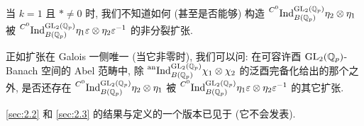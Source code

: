\begin{remark}\label{rem:2.3.2}
当 $k = 1$ 且 $* \neq 0$ 时, 我们不知道如何 (甚至是否能够) 构造 $\prescript{C^{0}}{}{\mathrm{Ind}}_{B(\mathbb{Q}_p)}^{\mathrm{GL}_2(\mathbb{Q}_p)} \eta_2 \otimes \eta_1$ 被 $\prescript{C^{0}}{}{\mathrm{Ind}}_{B(\mathbb{Q}_p)}^{\mathrm{GL}_2(\mathbb{Q}_p)} \eta_1\varepsilon \otimes \eta_2\varepsilon^{-1}$ 的非分裂扩张.
\end{remark}

\begin{remark}\label{rem:2.3.3}
正如扩张在 Galois 一侧唯一 (当它非零时), 我们可以问: 在可容许酉 $\mathrm{GL}_2(\mathbb{Q}_p)$-Banach 空间的 Abel 范畴中, 除 $\prescript{\mathrm{an}}{}{\mathrm{Ind}}_{B(\mathbb{Q}_p)}^{\mathrm{GL}_2(\mathbb{Q}_p)} \chi_1 \otimes \chi_2$ 的泛酉完备化给出的那个之外, 是否还存在 $\prescript{C^{0}}{}{\mathrm{Ind}}_{B(\mathbb{Q}_p)}^{\mathrm{GL}_2(\mathbb{Q}_p)} \eta_2 \otimes \eta_1$ 被 $\prescript{C^{0}}{}{\mathrm{Ind}}_{B(\mathbb{Q}_p)}^{\mathrm{GL}_2(\mathbb{Q}_p)} \eta_1\varepsilon \otimes \eta_2\varepsilon^{-1}$ 的其它扩张.
\end{remark}

\begin{remark}\label{rem:2.3.4}
\ref{sec:2.2} 和 \ref{sec:2.3} 的结果与定义的一个版本已见于 \cite[\S7]{ref:4} (它不会发表).
\end{remark}
